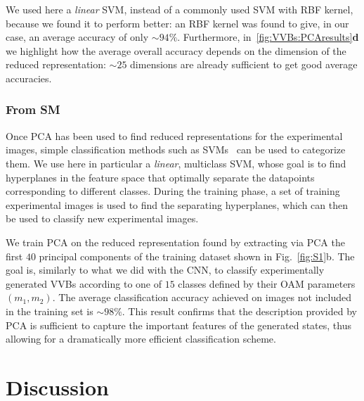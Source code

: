 We used here a \emph{linear} SVM, instead of a commonly used SVM with RBF kernel, because we found it to perform better: an RBF kernel was found to give, in our case, an average accuracy of only $\sim94\%$.
Furthermore, in~\cref{fig:VVBs:PCAresults}{\bf d} we highlight how the average overall accuracy depends on the dimension of the reduced representation: $\sim 25$ dimensions are already sufficient to get good average accuracies.

\subsubsection{From SM}

Once \ac{PCA} has been used to find reduced representations for the experimental images, simple classification methods such as \acp{SVM}~\cite{hearst1998support,shawe2000support} can be used to categorize them.
We use here in particular a \emph{linear}, multiclass \ac{SVM}, whose goal is to find hyperplanes in the feature space that optimally separate the datapoints corresponding to different classes.
During the training phase, a set of training experimental images is used to find the separating hyperplanes, which can then be used to classify new experimental images.

We train \ac{PCA} on the reduced representation found by extracting via \ac{PCA} the first $40$ principal components of the training dataset shown in Fig.~\ref{fig:S1}b. The goal is, similarly to what we did with the \ac{CNN}, to classify experimentally generated \acp{VVB} according to one of $15$ classes defined by their OAM parameters $(m_1,m_2)$.
The average classification accuracy achieved on images not included in the training set is $\sim 98 \%$. This result confirms that the description provided by \ac{PCA} is sufficient to capture the important features of the generated states, thus allowing for a dramatically more efficient classification scheme.


\section{Discussion}
\label{sec:VVBs:discussion}

